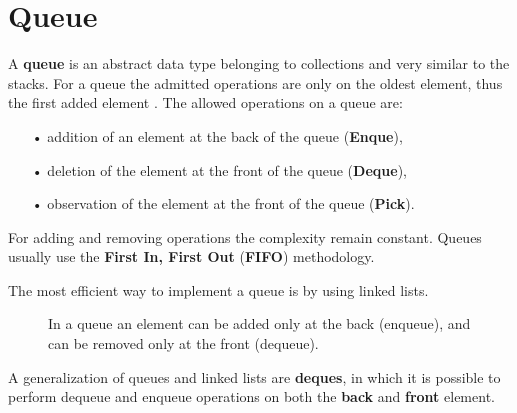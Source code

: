 \section{Queue}
\label{queue}
A \textbf{queue} is an abstract data type belonging to collections and very similar to the stacks. For a queue the admitted operations are only on the oldest element, thus the first added element \cite{wikiqueue}. The allowed operations on a queue are:
\begin{itemize}
\item[•] addition of an element at the back of the queue (\textbf{Enque}),
\item[•] deletion of the element at the front of the queue (\textbf{Deque}),
\item[•] observation of the element at the front of the queue (\textbf{Pick}).
\end{itemize}
For adding and removing operations the complexity remain constant. Queues usually use the \textbf{First In, First Out} (\textbf{FIFO}) methodology. 

The most efficient way to implement a queue is by using linked lists.

\begin{figure}[H]
\centering
{}
\caption[Allowed operations on a queue.]{In a queue an element can be added only at the back (enqueue), and can be removed only at the front (dequeue).}
\label{queue_1}
\end{figure}

A generalization of queues and linked lists are \textbf{deques}, in which it is possible to perform dequeue and enqueue operations on both the \textbf{back} and \textbf{front} element.

